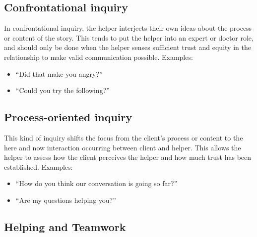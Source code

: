 \documentclass{article}
\newenvironment{nosepitemize}
{ \begin{itemize}
    \setlength{\itemsep}{0pt}
    \setlength{\parskip}{0pt}
    \setlength{\parsep}{0pt}     }
{ \end{itemize}                  }
\begin{document}
\begin{multicols}{2}
\subsection{Confrontational inquiry}

In confrontational inquiry, the helper interjects their own ideas about the process or content of the story. This tends to put the helper into an expert or doctor role, and should only be done when the helper senses sufficient trust and equity in the relationship to make valid communication possible. Examples:
\begin{nosepitemize}
    \item ``Did that make you angry?''
    \item ``Could you try the following?''
\end{nosepitemize}

\subsection{Process-oriented inquiry}

This kind of inquiry shifts the focus from the client's process or content to the here and now interaction occurring between client and helper. This allows the helper to assess how the client perceives the helper and how much trust has been established. Examples:
\begin{nosepitemize}
    \item ``How do you think our conversation is going so far?''
    \item ``Are my questions helping you?''
\end{nosepitemize}

\end{multicols}

\begin{center}
\section{Helping and Teamwork}
\end{center}
\end{document}

